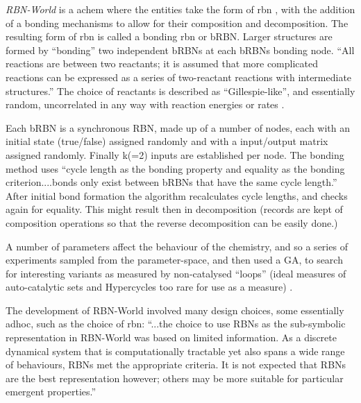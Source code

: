 
\emph{RBN-World} \parencite{Faulconbridge2011} is a \gls{achem} where the entities take the form of \gls{rbn} \parencite{Kauffman:1969ne}, with the addition of a bonding mechanisms to allow for their composition and decomposition. The resulting form of \gls{rbn} is called a bonding \gls{rbn} or bRBN.  Larger structures are formed by ``bonding'' two independent bRBNs at each bRBNs bonding node. ``All reactions are between two reactants; it is assumed that more complicated reactions can be expressed as a series of two-reactant reactions with intermediate structures.'' The choice of reactants is described as ``Gillespie-like'', and essentially random, uncorrelated in any way with reaction energies or rates \parencite[chap.8]{Faulconbridge2011}.

Each bRBN is a synchronous RBN, made up of a number of nodes, each with an initial state (true/false) assigned randomly and with a input/output matrix assigned randomly. Finally k(=2) inputs are established per node. The bonding method uses ``cycle length as the bonding property and equality as the bonding criterion....bonds only exist between bRBNs that have the same cycle length.'' After initial bond formation the algorithm recalculates cycle lengths, and checks again for equality. This might result then in decomposition (records are kept of composition operations so that the reverse decomposition can be easily done.)

A number of parameters affect the behaviour of the chemistry, and so a series of experiments sampled from the parameter-space, and then used a GA, to search for interesting variants as measured by non-catalysed ``loops'' (ideal measures of auto-catalytic sets and Hypercycles too rare for use as a measure) \parencite[chap.8]{Faulconbridge2011}. 

The development of RBN-World involved many design choices, some essentially adhoc, such as the choice of \gls{rbn}: ``...the choice to use RBNs as the sub-symbolic representation in RBN-World was based on limited information. As a discrete dynamical system that is computationally tractable yet also spans a wide range of behaviours, RBNs met the appropriate criteria. It is not expected that RBNs are the best representation however; others may be more suitable for particular emergent properties.''

